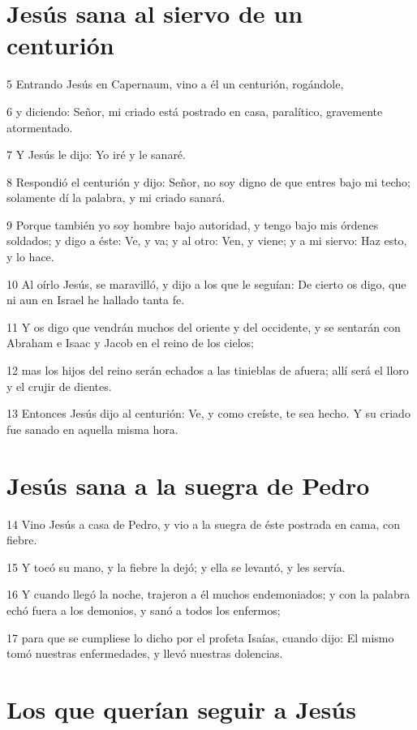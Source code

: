 \section*{Jesús sana al siervo de un centurión}

\par 5 Entrando Jesús en Capernaum, vino a él un centurión, rogándole,
\par 6 y diciendo: Señor, mi criado está postrado en casa, paralítico, gravemente atormentado.
\par 7 Y Jesús le dijo: Yo iré y le sanaré.
\par 8 Respondió el centurión y dijo: Señor, no soy digno de que entres bajo mi techo; solamente dí la palabra, y mi criado sanará.
\par 9 Porque también yo soy hombre bajo autoridad, y tengo bajo mis órdenes soldados; y digo a éste: Ve, y va; y al otro: Ven, y viene; y a mi siervo: Haz esto, y lo hace.
\par 10 Al oírlo Jesús, se maravilló, y dijo a los que le seguían: De cierto os digo, que ni aun en Israel he hallado tanta fe.
\par 11 Y os digo que vendrán muchos del oriente y del occidente, y se sentarán con Abraham e Isaac y Jacob en el reino de los cielos;
\par 12 mas los hijos del reino serán echados a las tinieblas de afuera; allí será el lloro y el crujir de dientes.
\par 13 Entonces Jesús dijo al centurión: Ve, y como creíste, te sea hecho. Y su criado fue sanado en aquella misma hora.

\section*{Jesús sana a la suegra de Pedro}

\par 14 Vino Jesús a casa de Pedro, y vio a la suegra de éste postrada en cama, con fiebre.
\par 15 Y tocó su mano, y la fiebre la dejó; y ella se levantó, y les servía.
\par 16 Y cuando llegó la noche, trajeron a él muchos endemoniados; y con la palabra echó fuera a los demonios, y sanó a todos los enfermos;
\par 17 para que se cumpliese lo dicho por el profeta Isaías, cuando dijo: El mismo tomó nuestras enfermedades, y llevó nuestras dolencias.

\section*{Los que querían seguir a Jesús}

